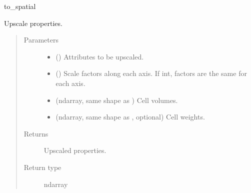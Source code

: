 \documentclass[letterpaper,10pt,english]{sphinxmanual}
\begin{document}
\begin{fulllineitems}
\begin{fulllineitems}
to\_spatial

\end{fulllineitems}


\begin{fulllineitems}
\label{\detokenize{api/rock:geology.src.Rock.upscale}}
Upscale properties.
\begin{quote}\begin{description}
\item[{Parameters}] \leavevmode\begin{itemize}
\item {} 
 (\sphinxstyleliteralemphasis{\sphinxupquote{, }}) \textendash{} Attributes to be upscaled.

\item {} 
 (\sphinxstyleliteralemphasis{\sphinxupquote{, }}) \textendash{} Scale factors along each axis. If int, factors are the same for each axis.

\item {} 
 (ndarray, same shape as ) \textendash{} Cell volumes.

\item {} 
 (ndarray, same shape as , optional) \textendash{} Cell weights.

\end{itemize}

\item[{Returns}] \leavevmode
{} \textendash{} Upscaled properties.

\item[{Return type}] \leavevmode
ndarray


\end{description}
\end{quote}
\end{fulllineitems}
\end{fulllineitems}
\end{document}
